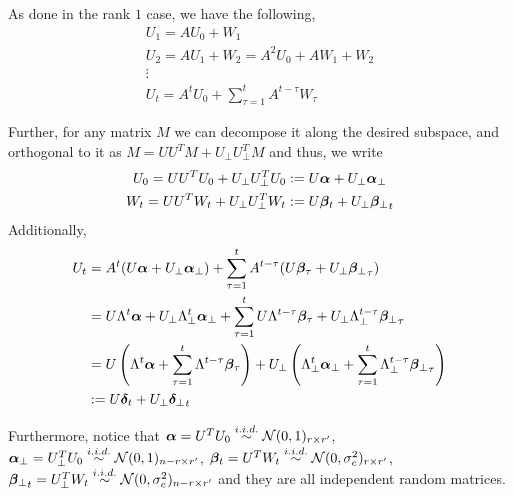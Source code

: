 \documentclass[10pt]{article}
\begin{document}
\newcommand{\utcos}{\bm{\delta}}
\newcommand{\utsin}{{\bm{\delta}_{\perp}}}


As done in the rank $1$ case, we have the following, 
\begin{gather*}
U_1 = A U_0 + W_1 \\
U_2 = A U_1 + W_2 = A^2 U_0 + A W_1 + W_2\\
\vdots \\
U_t = A^t U_0 + \sum_{\tau = 1}^t A^{t-\tau} W_\tau
\end{gather*}

Further, for any matrix $M$ we can decompose it along the desired subspace, and orthogonal to it as $M = U U^T M + U_{\perp} U_{\perp}^T M$ and thus, we write
\begin{gather*}
U_0 = U U^T U_0 + U_{\perp} U_{\perp}^T U_0 := U \bm{\alpha} + U_{\perp} \bm{\alpha}_{\perp} \\
W_t = U U^T W_t + U_{\perp} U_{\perp}^T W_t := U \bm{\beta}_t + U_{\perp} {\bm{\beta}_{\perp}}_t 
\end{gather*}
Additionally, 
\begin{align*}
U_t &= A^t (U \ucos + U_{\perp} \usin) + \sum_{\tau = 1}^t A^{t-\tau} (U \wcos_\tau + U_{\perp} \wsin_\tau) \\
&= U \Lambda^t \ucos + U_\perp \Lambda_\perp^t \usin + \sum_{\tau = 1}^t U \Lambda^{t-\tau} \wcos_\tau + U_\perp \Lambda_\perp^{t-\tau} \wsin_\tau \\
&= U\left( \Lambda^t \ucos + \sum_{\tau=1}^t \Lambda^{t-\tau} \wcos_\tau \right) + U_\perp \left( \Lambda_\perp^t \usin + \sum_{\tau=1}^t \Lambda_\perp^{t-\tau} \wsin_\tau \right) \\
&:= U \utcos_t + U_\perp \utsin_t
\end{align*}

Furthermore, notice that $\bm{\alpha} = U^T U_0 \overset{i.i.d.}{\sim} \mathcal{N}(0, 1)_{r \times r'}$, $\bm{\alpha}_{\perp} = U_\perp^T U_0 \overset{i.i.d.}{\sim} \mathcal{N}(0, 1)_{n- r \times r'}$, $\bm{\beta}_t = U^T W_t \overset{i.i.d.}{\sim} \mathcal{N}(0, \sigma_c^2 )_{r \times r'}$, ${\bm{\beta}_{\perp}}_t = U_\perp^T W_t \overset{i.i.d.}{\sim} \mathcal{N}(0, \sigma_c^2)_{n- r \times r'}$ and they are all independent random matrices. 
\end{document}
